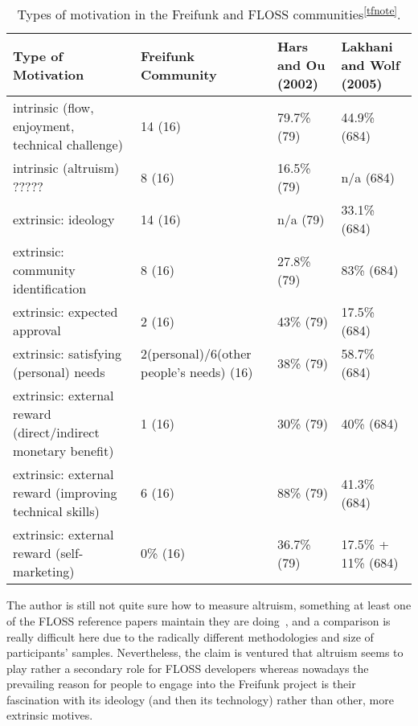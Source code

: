 \begin{table}[h]
  \begin{tabular}{| p{4cm} | p{4cm} | p{4cm} | p{4cm} |}
    \hline
    \textbf{Type of Motivation} & \textbf{Freifunk Community} & \textbf{Hars and Ou (2002)} & \textbf{Lakhani and Wolf (2005)}\\
    \hline
    intrinsic (flow, enjoyment, technical challenge) & 14 (16) & 79.7\% (79) & 44.9\% (684) \\
    \hline
    intrinsic (altruism) ????? & 8 (16) & 16.5\% (79) & n/a (684) \\
    \hline
    extrinsic: ideology & 14 (16) & n/a (79)& 33.1\% (684) \\
    \hline
    extrinsic: community identification & 8 (16) & 27.8\% (79)& 83\% (684) \\
    \hline
    extrinsic: expected approval & 2 (16)& 43\% (79)& 17.5\% (684) \\
    \hline
    extrinsic: satisfying (personal) needs & 2(personal)/6(other people's needs) (16) & 38\% (79) & 58.7\% (684) \\
    \hline
    extrinsic: external reward (direct/indirect monetary benefit)& 1 (16) & 30\% (79) & 40\% (684) \\
    \hline
    extrinsic: external reward (improving technical skills)& 6 (16) & 88\% (79) & 41.3\% (684) \\
    \hline
    extrinsic: external reward (self-marketing)& 0\% (16) & 36.7\% (79)& 17.5\% + 11\% (684) \\
    \hline
  \end{tabular}
  \caption{Types of motivation in the Freifunk and FLOSS communities\textsuperscript{\ref{tfnote}}.}
\label{tab:motivation}
\end{table}



The author is still not quite sure how to measure altruism, something at least one of the FLOSS reference papers maintain they are doing~\cite{HarOu2002}, and a comparison is really difficult here due to the radically different methodologies and size of participants' samples.
Nevertheless, the claim is ventured that altruism seems to play rather a secondary role for FLOSS developers whereas nowadays the prevailing reason for people to engage into the Freifunk project is their fascination with its ideology (and then its technology) rather than other, more extrinsic motives.


